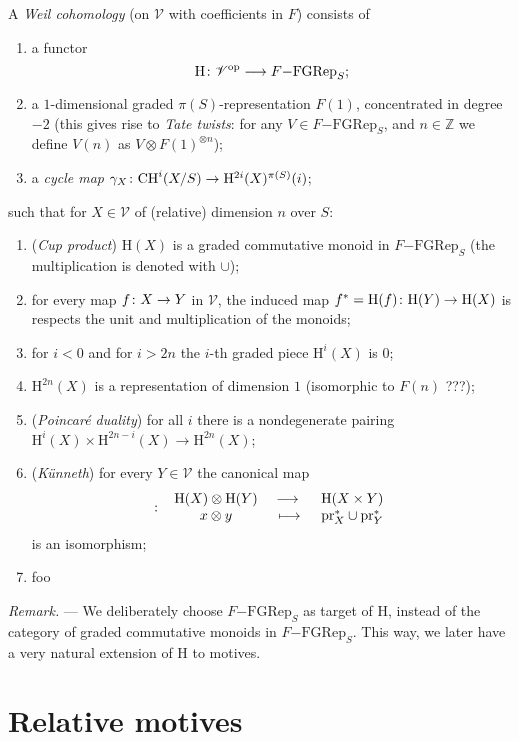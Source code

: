 \documentclass[a4paper,10pt]{article}
\makeatletter
\newenvironment{remark}{\textit{Remark.} --- }{}
\newcommand*\map@arrow[1][]{\csname#1rightarrow\endcsname{}}
\newcommand*\function@textstyle[4][]{#2\colon#3\map@arrow[#1]#4}
\newcommand*\function[4][]{%
	\mathchoice
	{\function@textstyle[long#1]{#2}{#3}{#4}}
	{\function@textstyle[#1]{#2}{#3}{#4}}
	{\function@textstyle[#1]{#2}{#3}{#4}}
	{\function@textstyle[#1]{#2}{#3}{#4}}
}
\newcommand*\map@textstyle[6][]{#2\colon#3\rightarrow#4:#5\mapsto#6}
\newcommand*\map[6][]{%
	\mathchoice
	{#2\colon\
		\begin{array}{ccc}
			#3&~\map@arrow[long#1]~&#4 \\
			#5&~\longmapsto~&#6
		\end{array}
	}
	{\map@textstyle[#1]{#2}{#3}{#4}{#5}{#6}}
	{\map@textstyle[#1]{#2}{#3}{#4}{#5}{#6}}
	{\map@textstyle[#1]{#2}{#3}{#4}{#5}{#6}}
}
\def\basepieces{\mathscr{V}}
\newcommand{\fgrep}[2]{#1\mathrm{-FGRep}_{#2}}
\def\coh{\mathrm{H}}
\def\tensor{\otimes}
\def\CH{\mathrm{CH}}
\def\pr{\mathrm{pr}}
\makeatother
\begin{document}
A \emph{Weil cohomology} (on $\basepieces$ with coefficients in $F$) consists
of
\begin{enumerate}[label=(D\arabic*)] %
	\item a functor
		\[
			\function{\coh}%
			{\basepieces^{\mathrm{op}}}%
			{\fgrep{F}{S}};
		\]
	\item a $1$-dimensional graded $\pi(S)$-representation $F(1)$,
		concentrated in degree $-2$ (this gives rise to \emph{Tate
		twists}: for any $V \in \fgrep{F}{S}$, and $n \in \mathbb{Z}$
		we define $V(n)$ as $V \tensor F(1)^{\tensor n}$);
	\item a \emph{cycle map}
		$\function{\gamma_{X}}%
		{\CH^{i}(X/S)}%
		{\coh^{2i}(X)^{\pi(S)}(i)}$;
\end{enumerate} %
such that for $X \in \basepieces$ of (relative) dimension $n$ over $S$:
\begin{enumerate}[label=(C\arabic*)] %
	\item (\emph{Cup product}) $\coh(X)$ is a graded commutative monoid in
		$\fgrep{F}{S}$ (the multiplication is denoted with $\cup$);
	\item for every map $\function{f}{X}{Y}$ in $\basepieces$, the induced
		map $f^{*} = \function{\coh(f)}{\coh(Y)}{\coh(X)}$ is respects
		the unit and multiplication of the monoids;
	\item for $i < 0$ and for $i > 2n$ the $i$-th graded piece
		$\coh^{i}(X)$ is $0$;
	\item $\coh^{2n}(X)$ is a representation of dimension $1$ (isomorphic
		to $F(n)$ ???);
	\item (\emph{Poincar\'{e} duality}) for all $i$ there is a
		nondegenerate pairing $\coh^{i}(X) \times \coh^{2n-i}(X) \to
		\coh^{2n}(X)$;
	\item (\emph{K\"{u}nneth}) for every $Y \in \basepieces$
		the canonical map
		\[
			\map{}{\coh(X) \tensor \coh(Y)}{\coh(X \times Y)}%
			{x \tensor y}{\pr_{X}^{*} \cup \pr_{Y}^{*}}
		\]
		is an isomorphism;
	\item foo
\end{enumerate} %

\begin{remark} %
	We deliberately choose $\fgrep{F}{S}$ as target of $\coh$, instead of
	the category of graded commutative monoids in $\fgrep{F}{S}$. This way,
	we later have a very natural extension of $\coh$ to motives.
\end{remark} %

\section{Relative motives}
\end{document}

